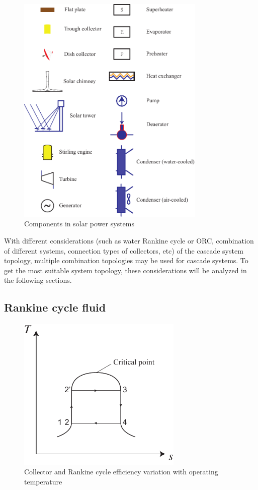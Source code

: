 \begin{figure}[!ht]
\centering
\includegraphics[width=0.8\textwidth]{fig/Legends.pdf}
\caption{Components in solar power systems}\label{fig:Legends}
\end{figure}

With different considerations (such as water Rankine cycle or ORC, combination of different systems, connection types of collectors, etc) of the cascade system topology, multiple combination topologies may be used for cascade systems. To get the most suitable system topology, these considerations will be analyzed in the following sections. 

\subsection{Rankine cycle fluid}
\label{sec:RankineCycleFluid}

\begin{figure}[!ht]
\centering 
\includegraphics[width=0.7\textwidth]{fig/idealTs}
\caption{Collector and Rankine cycle efficiency variation with operating temperature}\label{fig:idealTs}
\end{figure}

